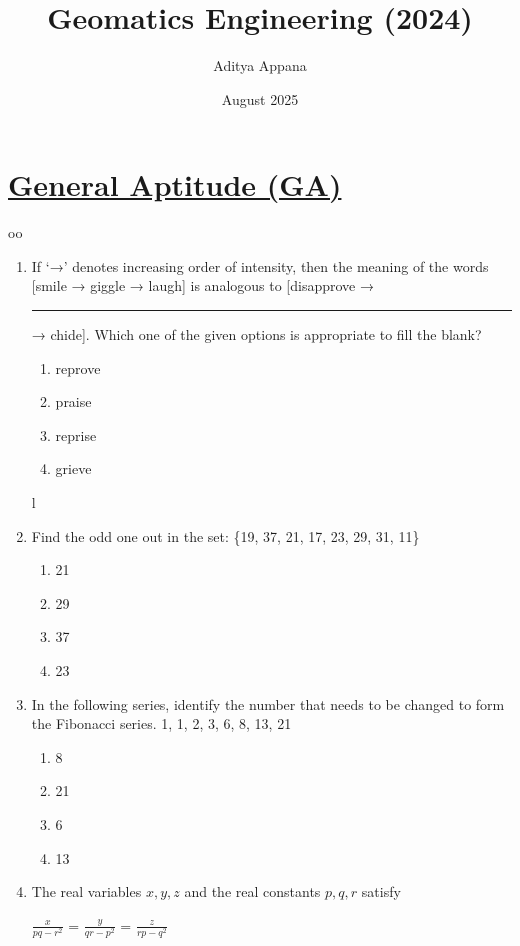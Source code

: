 \documentclass[12pt]{article}
\title{Geomatics Engineering (2024)}
\author{Aditya Appana}
\date{August 2025}
\begin{document}
\maketitle

\section*{\underline{General Aptitude (GA)}}
oo
\begin{enumerate}

\item If ‘→’ denotes increasing order of intensity, then the meaning of the words [smile → giggle → laugh] is analogous to [disapprove → \rule{1.5cm}{0.15mm} → chide]. Which one of the given options is appropriate to fill the blank?
\begin{enumerate}
    

   \item reprove  
   \item praise  
   \item reprise  
   \item grieve  
    
\end{enumerate}
l
\item Find the odd one out in the set: \{19, 37, 21, 17, 23, 29, 31, 11\}

\begin{enumerate}
    \item 21  
   \item 29  
   \item 37  
   \item 23  
\end{enumerate}

\item In the following series, identify the number that needs to be changed to form the
Fibonacci series. 1, 1, 2, 3, 6, 8, 13, 21  

\begin{enumerate}
    \item8 
   \item 21 
   \item 6  
   \item 13 
\end{enumerate}


\item The real variables $x,y,z$ and the real constants $p,q,r$ satisfy  \\   \begin{Large} $\frac{x}{pq-r^2}$ =     $\frac{y}{qr-p^2}$ = $\frac{z}{rp-q^2}$ \end{Large}


\end{enumerate}
\end{document}
